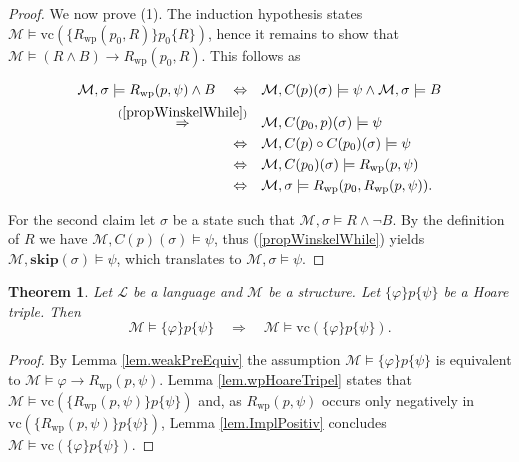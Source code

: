 \documentclass[acmsmall]{acmart}
\theoremstyle{plain}
\newtheorem{theorem}{Theorem}
\theoremstyle{definition}
\newcommand{\calL}{\mathcal{L}}
\newcommand{\calM}{\mathcal{M}}
\newcommand{\impl}{\rightarrow} %
\newcommand{\hoare}[3]{\{#1\}#2\{#3\}}
\newcommand{\vc}{\mathrm{vc}}
\newcommand{\hskipit}{\textbf{skip}}
\renewcommand{\wp}{\mathrm{wp}}
\newcommand{\Rwp}{R_{\wp}}
\begin{document}
\begin{proof}
We now prove (1). The induction hypothesis states $\calM \models \vc(\hoare{\Rwp(p_0,R)}{p_0}{R})$, hence it remains to show that $\calM \models (R \wedge B) \impl \Rwp(p_0,R)$. This follows as 

 \begin{align*}
	\calM, \sigma \models \Rwp(p,\psi) \wedge B \quad 
	\Leftrightarrow \quad&  \calM, C(p)(\sigma) \models \psi \wedge \calM,\sigma \models B \\
	\overset{(\ref{propWinskelWhile})}{\Rightarrow} \quad& \calM,  C(p_0,p)(\sigma) \models \psi \\
	\Leftrightarrow \quad& \calM, C(p) \circ C(p_0)(\sigma) \models \psi \\
	\Leftrightarrow \quad& \calM, C(p_0)(\sigma) \models \Rwp(p,\psi) \\
	\Leftrightarrow \quad& \calM, \sigma \models \Rwp(p_0,\Rwp(p,\psi)).
\end{align*}



For the second claim let $\sigma$ be a state such that $\calM,\sigma \models R \wedge \neg B$. By the definition of $R$ we have $\calM,C(p)(\sigma) \models \psi$, thus (\ref{propWinskelWhile}) yields $\calM, \hskipit(\sigma) \models \psi$, which translates to $\calM, \sigma \models \psi$.


\end{proof}

\begin{theorem}\label{thm.vcCompleteness}
	Let $\calL$ be a language and $\calM$ be a structure. Let $\hoare{\varphi}{p}{\psi}$ be a Hoare triple. Then 
	\[
	\calM \models \hoare{\varphi}{p}{\psi} \quad \Rightarrow \quad \calM \models \vc(\hoare{\varphi}{p}{\psi}).
	\]
\end{theorem}
\begin{proof}
	By Lemma \ref{lem.weakPreEquiv} the assumption $\calM \models \hoare{\varphi}{p}{\psi}$ is equivalent to $\calM \models \varphi \impl R_{\wp}(p,\psi)$. Lemma \ref{lem.wpHoareTripel} states that $\calM \models \vc(\hoare{R_{\wp}(p,\psi)}{p}{\psi})$ and, as $R_{\wp}(p,\psi)$ occurs only negatively in $\vc(\hoare{R_{\wp}(p,\psi)}{p}{\psi})$, Lemma \ref{lem.ImplPositiv} concludes $\calM \models \vc(\hoare{\varphi}{p}{\psi})$.
\end{proof}
\end{document}
